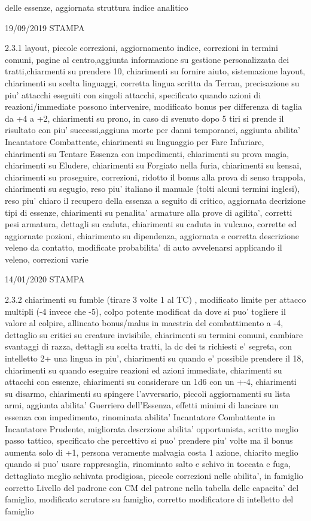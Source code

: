\documentclass[a4paper,11pt,twoside,openany]{dndbook}
\begin{document}
{delle essenze, aggiornata struttura indice analitico

19/09/2019 STAMPA

2.3.1 layout, piccole correzioni, aggiornamento indice, correzioni in termini comuni, pagine al centro,aggiunta informazione su gestione personalizzata dei tratti,chiarmenti su prendere 10, chiarimenti su fornire aiuto, sistemazione layout, chiarimenti su scelta linguaggi, corretta lingua scritta da Terran, precisazione su piu' attacchi eseguiti con singoli attacchi, specificato quando azioni di reazioni/immediate possono intervenire, modificato bonus per differenza di taglia da +4 a +2, chiarimenti su prono, in caso di svenuto dopo 5 tiri si prende il risultato con piu' successi,aggiuna morte per danni temporanei, aggiunta abilita' Incantatore Combattente, chiarimenti su linguaggio per Fare Infuriare, chiarimenti su Tentare Essenza con impedimenti, chiarimenti su prova magia, chiarimenti su Eludere, chiarimenti su Forgiato nella furia, chiarimenti su kensai, chiarimenti su proseguire, correzioni, ridotto il bonus alla prova di senso trappola, chiarimenti su segugio, reso piu' italiano il manuale (tolti alcuni termini inglesi), reso piu' chiaro il recupero della essenza a seguito di critico, aggiornata decrizione tipi di essenze, chiarimenti su penalita' armature alla prove di agilita', corretti pesi armatura, dettagli su caduta, chiarimenti su caduta in vulcano, corrette ed aggiornate pozioni, chiarimento su dipendenza, aggiornata e corretta descrizione veleno da contatto, modificate probabilita' di auto avvelenarsi applicando il veleno, correzioni varie

14/01/2020 STAMPA

2.3.2 chiarimenti su fumble (tirare 3 volte 1 al TC) , modificato limite per attacco multipli (-4 invece che -5), colpo potente modificat da dove si puo' togliere il valore al colpire, allineato bonus/malus in maestria del combattimento a -4, dettaglio su critici su creature invisibile, chiarimenti su termini comuni, cambiare svantaggi di razza, dettagli su scelta tratti, la dc dei ts richiesti e' segreta, con intelletto 2+ una lingua in piu', chiarimenti su quando e' possibile prendere il 18, chiarimenti su quando eseguire reazioni ed azioni immediate, chiarimenti su attacchi con essenze, chiarimenti su considerare un 1d6 con un +-4, chiarimenti su disarmo, chiarimenti su spingere l'avversario, piccoli aggiornamenti su lista armi, aggiunta abilita' Guerriero dell'Essenza, effetti minimi di lanciare un essenza con impedimento, rinominata abilita' Incantatore Combattente in Incantatore Prudente, migliorata descrzione abilita' opportunista, scritto meglio passo tattico, specificato che percettivo si puo' prendere piu' volte ma il bonus aumenta solo di +1, persona veramente malvagia costa 1 azione, chiarito meglio quando si puo' usare rappresaglia, rinominato salto e schivo in toccata e fuga, dettagliato meglio schivata prodigiosa, piccole correzioni nelle abilita', in famiglio corretto Livello del padrone con CM del patrone nella tabella delle capacita' del famiglio, modificato scrutare su famiglio, corretto modificatore di intelletto del famiglio

}
\end{document}
